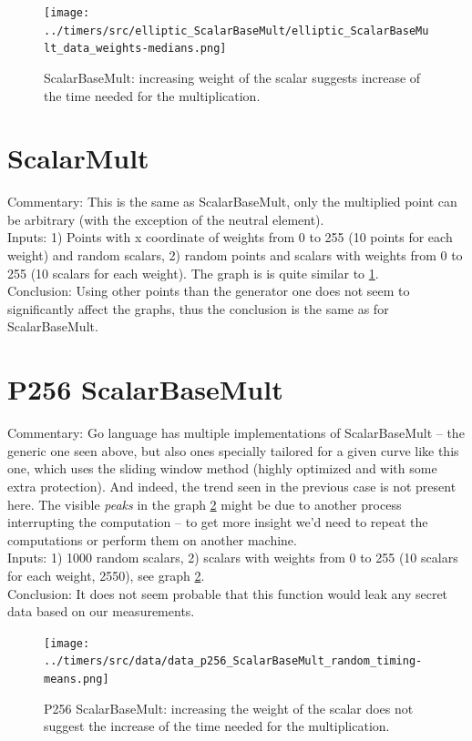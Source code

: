 \documentclass[a4paper]{scrartcl}
\begin{document}
\begin{figure}
    \centering
  \texttt{[image: ../timers/src/elliptic\_ScalarBaseMult/elliptic\_ScalarBaseMult\_data\_weights-medians.png]}
  \caption{ScalarBaseMult: increasing weight of the scalar suggests increase of the time needed for the multiplication.}
  \label{fig:generic_ScalarBaseMult}
\end{figure}

\section{ScalarMult}
Commentary: This is the same as ScalarBaseMult, only the multiplied point can be arbitrary (with the exception of the neutral element).
\\Inputs: 1) Points with x coordinate of weights from 0 to 255 (10 points for each weight) and random scalars, 2) random points and scalars with weights from 0 to 255 (10 scalars for each weight). The graph is is quite similar to \ref{fig:generic_ScalarBaseMult}.%
\\Conclusion: Using other points than the generator one does not seem to significantly affect the graphs, thus the conclusion is the same as for ScalarBaseMult.

\section{P256 ScalarBaseMult}
Commentary: Go language has multiple implementations of ScalarBaseMult -- the generic one seen above, but also ones specially tailored for a given curve like this one, which uses the sliding window method (highly optimized and with some extra protection). And indeed, the trend seen in the previous case is not present here. The visible \textit{peaks} in the graph \ref{fig:p256_ScalarBaseMult} might be due to another process interrupting the computation -- to get more insight we'd need to repeat the computations or perform them on another machine.
\\Inputs: 1) 1000 random scalars, 2) scalars with weights from 0 to 255 (10 scalars for each weight, 2550), see graph \ref{fig:p256_ScalarBaseMult}.
\\Conclusion: It does not seem probable that this function would leak any secret data based on our measurements.

\begin{figure}
    \centering
  \texttt{[image: ../timers/src/data/data\_p256\_ScalarBaseMult\_random\_timing-means.png]}
  \caption{P256 ScalarBaseMult: increasing the weight of the scalar does not suggest the increase of the time needed for the multiplication.}
  \label{fig:p256_ScalarBaseMult}
\end{figure}
\end{document}
